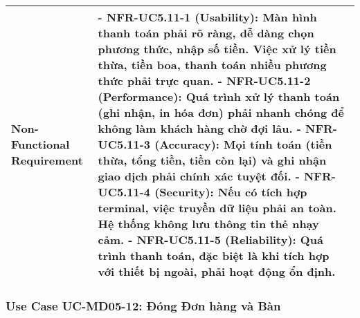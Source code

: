 \begin{longtable}{|m{4cm}|p{11cm}|}
\hline
Non-Functional Requirement & - \textbf{NFR-UC5.11-1 (Usability):} Màn hình thanh toán phải rõ ràng, dễ dàng chọn phương thức, nhập số tiền. Việc xử lý tiền thừa, tiền boa, thanh toán nhiều phương thức phải trực quan. \newline - \textbf{NFR-UC5.11-2 (Performance):} Quá trình xử lý thanh toán (ghi nhận, in hóa đơn) phải nhanh chóng để không làm khách hàng chờ đợi lâu. \newline - \textbf{NFR-UC5.11-3 (Accuracy):} Mọi tính toán (tiền thừa, tổng tiền, tiền còn lại) và ghi nhận giao dịch phải chính xác tuyệt đối. \newline - \textbf{NFR-UC5.11-4 (Security):} Nếu có tích hợp terminal, việc truyền dữ liệu phải an toàn. Hệ thống không lưu thông tin thẻ nhạy cảm. \newline - \textbf{NFR-UC5.11-5 (Reliability):} Quá trình thanh toán, đặc biệt là khi tích hợp với thiết bị ngoài, phải hoạt động ổn định. \\
\hline
\end{longtable}

\subsubsection{Use Case UC-MD05-12: Đóng Đơn hàng và Bàn}

